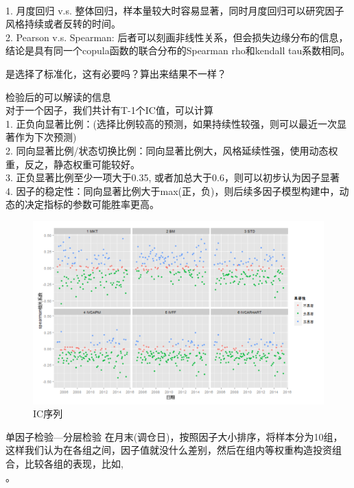 \documentclass[12pt]{article}
\begin{document}
\begin{sremark}{}{} \\
1. 月度回归 v.s. 整体回归，样本量较大时容易显著，同时月度回归可以研究因子风格持续或者反转的时间。 \\
2. Pearson v.s. Spearman: 后者可以刻画非线性关系，但会损失边缘分布的信息，结论是具有同一个copula函数的联合分布的Spearman rho和kendall tau系数相同。
\end{sremark}
是选择了标准化，这有必要吗？算出来结果不一样？
\begin{sremark}{}{} 检验后的可以解读的信息 \\
对于一个因子，我们共计有T-1个IC值，可以计算 \\
1. 正负向显著比例：(选择比例较高的预测，如果持续性较强，则可以最近一次显著作为下次预测) \\
2. 同向显著比例/状态切换比例：同向显著比例大，风格延续性强，使用动态权重，反之，静态权重可能较好。\\
3. 正负显著比例至少一项大于0.35, 或者加总大于0.6，则可以初步认为因子显著 \\
4. 因子的稳定性：同向显著比例大于max(正，负)，则后续多因子模型构建中，动态的决定指标的参数可能胜率更高。
\end{sremark}
\begin{figure}[htb]
\centering
\includegraphics[scale=0.6]{figure/IC显著性.jpg}
\caption{IC序列}
\end{figure}

\begin{sdefinition}{单因子检验—分层检验}{}
在月末(调仓日)，按照因子大小排序，将样本分为10组，这样我们认为在各组之间，因子值就没什么差别，然后在组内等权重构造投资组合，比较各组的表现，比如, \\
。
\end{sdefinition}
\end{document}
